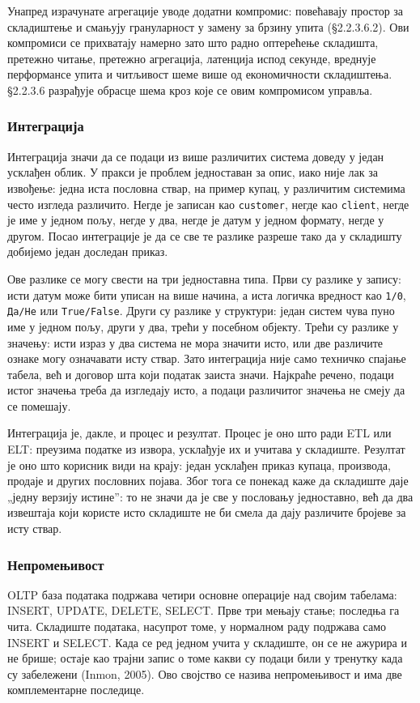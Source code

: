 Унапред израчунате агрегације уводе додатни компромис: повећавају простор за складиштење и смањују грануларност у замену за брзину упита (§2.2.3.6.2). Ови компромиси се прихватају намерно зато што радно оптерећење складишта, претежно читање, претежно агрегација, латенција испод секунде, вреднује перформансе упита и читљивост шеме више од економичности складиштења. §2.2.3.6 разрађује обрасце шема кроз које се овим компромисом управља.

\subsubsection{Интеграција}
Интеграција значи да се подаци из више различитих система доведу у један усклађен облик. У пракси је проблем једноставан за опис, иако није лак за извођење: једна иста пословна ствар, на пример купац, у различитим системима често изгледа различито. Негде је записан као \texttt{customer}, негде као \texttt{client}, негде је име у једном пољу, негде у два, негде је датум у једном формату, негде у другом. Посао интеграције је да се све те разлике разреше тако да у складишту добијемо један доследан приказ.

Ове разлике се могу свести на три једноставна типа. Први су разлике у запису: исти датум може бити уписан на више начина, а иста логичка вредност као \texttt{1/0}, \texttt{Да/Не} или \texttt{True/False}. Други су разлике у структури: један систем чува пуно име у једном пољу, други у два, трећи у посебном објекту. Трећи су разлике у значењу: исти израз у два система не мора значити исто, или две различите ознаке могу означавати исту ствар. Зато интеграција није само техничко спајање табела, већ и договор шта који податак заиста значи. Најкраће речено, подаци истог значења треба да изгледају исто, а подаци различитог значења не смеју да се помешају.

Интеграција је, дакле, и процес и резултат. Процес је оно што ради ETL или ELT: преузима податке из извора, усклађује их и учитава у складиште. Резултат је оно што корисник види на крају: један усклађен приказ купаца, производа, продаје и других пословних појава. Због тога се понекад каже да складиште даје „једну верзију истине”: то не значи да је све у пословању једноставно, већ да два извештаја који користе исто складиште не би смела да дају различите бројеве за исту ствар.

\subsubsection{Непромењивост}
OLTP база података подржава четири основне операције над својим табелама: INSERT, UPDATE, DELETE, SELECT. Прве три мењају стање; последња га чита. Складиште података, насупрот томе, у нормалном раду подржава само INSERT и SELECT. Када се ред једном учита у складиште, он се не ажурира и не брише; остаје као трајни запис о томе какви су подаци били у тренутку када су забележени (Inmon, 2005). Ово својство се назива непромењивост и има две комплементарне последице.

